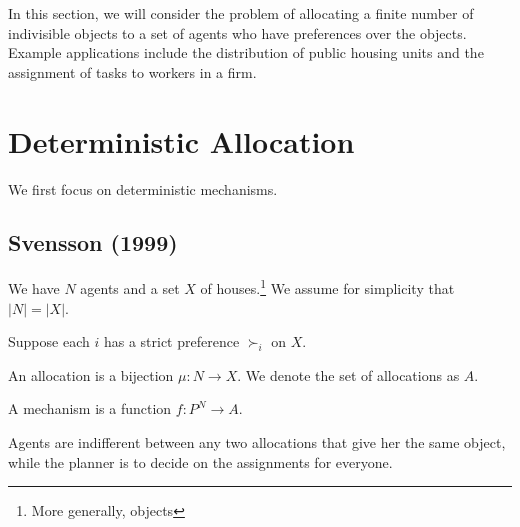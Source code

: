 
In this section, we will consider the problem of allocating a finite number of indivisible objects to a set of agents who have preferences over the objects. 
Example applications include the distribution of public housing units and the assignment of tasks to workers in a firm.

\section{Deterministic Allocation}

We first focus on deterministic mechanisms.

\subsection{Svensson (1999)}

We have $N$ agents and a set $X$ of houses.\footnote{More generally, objects} We assume for simplicity that $\left| N \right| = \left| X \right|$.

Suppose each $i$ has a strict preference $\succ_i$ on $X$. 

\begin{definition}
	An allocation is a bijection $\mu: N \to X$. We denote the set of allocations as $A$.

	A mechanism is a function $f: P^N \to A$.
\end{definition}
Agents are indifferent between any two allocations that give her the same object, while the planner is to decide on the assignments for everyone.

